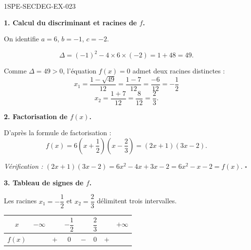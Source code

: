 \begin{corrige}{1SPE-SECDEG-EX-023}

\textbf{1. Calcul du discriminant et racines de $f$.}


On identifie $a = 6$, $b = -1$, $c = -2$.

\[\Delta = (-1)^2 - 4 \times 6 \times (-2) = 1 + 48 = 49.\]

Comme $\Delta = 49 > 0$, l'équation $f(x) = 0$ admet deux racines distinctes :
\[x_1 = \frac{1 - \sqrt{49}}{12} = \frac{1 - 7}{12} = \frac{-6}{12} = -\frac{1}{2}\]
\[x_2 = \frac{1 + 7}{12} = \frac{8}{12} = \frac{2}{3}.\]

\medskip
\textbf{2. Factorisation de $f(x)$.}


D'après la formule de factorisation :
\[f(x) = 6\left(x + \frac{1}{2}\right)\!\left(x - \frac{2}{3}\right) = (2x + 1)(3x - 2).\]

\textit{Vérification :} $(2x+1)(3x-2) = 6x^2 - 4x + 3x - 2 = 6x^2 - x - 2 = f(x)$. \hfill $\square$

\medskip
\textbf{3. Tableau de signes de $f$.}


Les racines $x_1 = -\dfrac{1}{2}$ et $x_2 = \dfrac{2}{3}$ délimitent trois intervalles.

\medskip
\begin{center}
\begin{tabular}{|c|ccccccc|}
\hline
$x$ & $-\infty$ & & $-\dfrac{1}{2}$ & & $\dfrac{2}{3}$ & & $+\infty$ \\
\hline
$f(x)$ & & $+$ & $0$ & $-$ & $0$ & $+$ & \\
\hline
\end{tabular}
\end{center}


\end{corrige}
